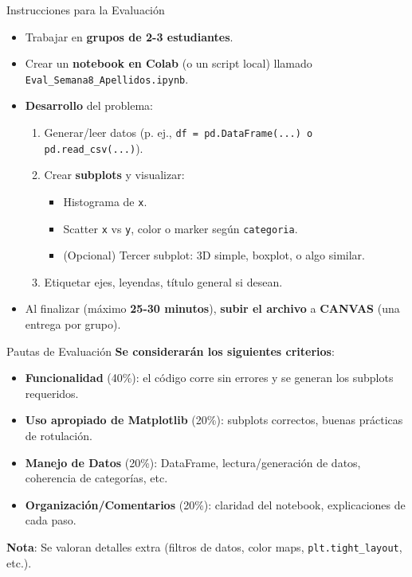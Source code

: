 \documentclass[10pt]{beamer}
\begin{document}
\begin{frame}{Instrucciones para la Evaluación}
  \begin{itemize}
    \item Trabajar en \textbf{grupos de 2-3 estudiantes}.
    \item Crear un \textbf{notebook en Colab} (o un script local) llamado \texttt{Eval\_Semana8\_Apellidos.ipynb}.
    \item \textbf{Desarrollo} del problema:
      \begin{enumerate}
        \item Generar/leer datos (p. ej., \texttt{df = pd.DataFrame(...) o pd.read\_csv(...)}).
        \item Crear \textbf{subplots} y visualizar:
          \begin{itemize}
            \item Histograma de \texttt{x}.
            \item Scatter \texttt{x} vs \texttt{y}, color o marker según \texttt{categoria}.
            \item (Opcional) Tercer subplot: 3D simple, boxplot, o algo similar.
          \end{itemize}
        \item Etiquetar ejes, leyendas, título general si desean.
      \end{enumerate}
    \item Al finalizar (máximo \textbf{25-30 minutos}), \textbf{subir el archivo} a \textbf{CANVAS} (una entrega por grupo).
  \end{itemize}
\end{frame}

\begin{frame}{Pautas de Evaluación}
  \textbf{Se considerarán los siguientes criterios}:
  \begin{itemize}
    \item \textbf{Funcionalidad} (40\%): el código corre sin errores y se generan los subplots requeridos.
    \item \textbf{Uso apropiado de Matplotlib} (20\%): subplots correctos, buenas prácticas de rotulación.
    \item \textbf{Manejo de Datos} (20\%): DataFrame, lectura/generación de datos, coherencia de categorías, etc.
    \item \textbf{Organización/Comentarios} (20\%): claridad del notebook, explicaciones de cada paso.
  \end{itemize}
  \vspace{0.3cm}
  \textbf{Nota}: Se valoran detalles extra (filtros de datos, color maps, \texttt{plt.tight\_layout}, etc.).
\end{frame}
\end{document}
